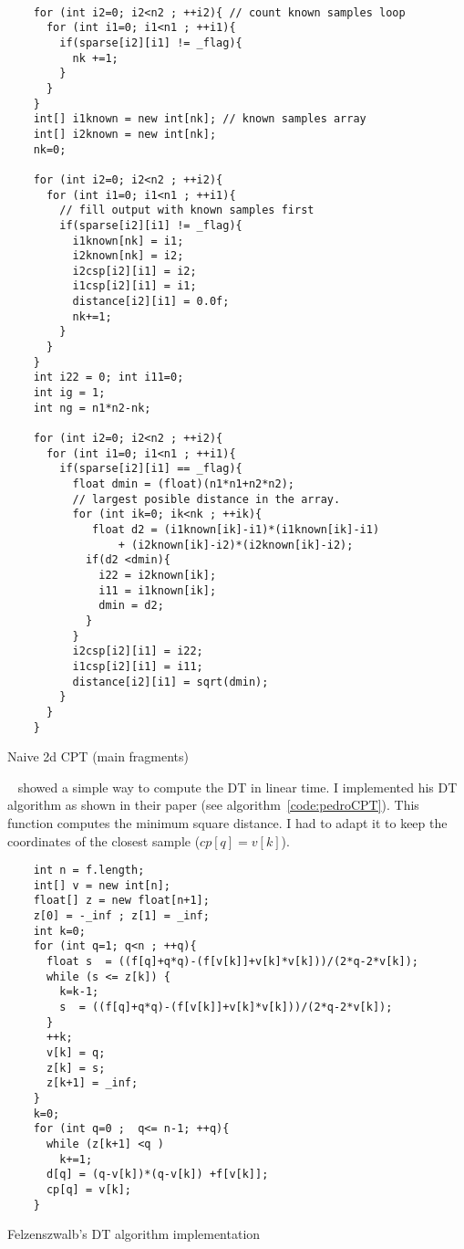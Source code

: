 \documentclass[10pt]{article}
\begin{document}
  
\begin{program}
\begin{verbatim}

    for (int i2=0; i2<n2 ; ++i2){ // count known samples loop 
      for (int i1=0; i1<n1 ; ++i1){ 
        if(sparse[i2][i1] != _flag){ 
          nk +=1;
        } 
      }                                   
    } 
    int[] i1known = new int[nk]; // known samples array
    int[] i2known = new int[nk];
    nk=0;

    for (int i2=0; i2<n2 ; ++i2){ 
      for (int i1=0; i1<n1 ; ++i1){ 
        // fill output with known samples first
        if(sparse[i2][i1] != _flag){ 
          i1known[nk] = i1;
          i2known[nk] = i2;
          i2csp[i2][i1] = i2;
          i1csp[i2][i1] = i1;
          distance[i2][i1] = 0.0f;
          nk+=1;
        } 
      }                                   
    }
    int i22 = 0; int i11=0;
    int ig = 1;
    int ng = n1*n2-nk;

    for (int i2=0; i2<n2 ; ++i2){ 
      for (int i1=0; i1<n1 ; ++i1){ 
        if(sparse[i2][i1] == _flag){ 
          float dmin = (float)(n1*n1+n2*n2);
          // largest posible distance in the array.
          for (int ik=0; ik<nk ; ++ik){
             float d2 = (i1known[ik]-i1)*(i1known[ik]-i1)
                 + (i2known[ik]-i2)*(i2known[ik]-i2); 
            if(d2 <dmin){
              i22 = i2known[ik];
              i11 = i1known[ik];
              dmin = d2;
            }            
          }
          i2csp[i2][i1] = i22;
          i1csp[i2][i1] = i11;
          distance[i2][i1] = sqrt(dmin);
        }
      }                                   
    } 
\end{verbatim}
  \caption{Naive 2d CPT (main fragments)}
  \label{code:naiveCPT2d}
\end{program}    


 ~\cite{Pedro_dt} showed a simple way to compute the DT in linear time. I implemented
his DT algorithm as shown in their paper (see algorithm~\ref{code:pedroCPT}). This 
function computes the minimum square distance. I had to adapt it to keep the coordinates
of the closest sample ($cp[q] = v[k]$). 

\begin{program}
\begin{verbatim}
    int n = f.length; 
    int[] v = new int[n];
    float[] z = new float[n+1];
    z[0] = -_inf ; z[1] = _inf;
    int k=0;
    for (int q=1; q<n ; ++q){
      float s  = ((f[q]+q*q)-(f[v[k]]+v[k]*v[k]))/(2*q-2*v[k]);
      while (s <= z[k]) {
        k=k-1;
        s  = ((f[q]+q*q)-(f[v[k]]+v[k]*v[k]))/(2*q-2*v[k]);
      }
      ++k;
      v[k] = q;
      z[k] = s;
      z[k+1] = _inf;
    } 
    k=0;
    for (int q=0 ;  q<= n-1; ++q){
      while (z[k+1] <q )
        k+=1;
      d[q] = (q-v[k])*(q-v[k]) +f[v[k]];
      cp[q] = v[k];
    }   
\end{verbatim}
  \caption{Felzenszwalb's DT algorithm implementation}
  \label{code:pedroCPT}
\end{program}    
\end{document}
